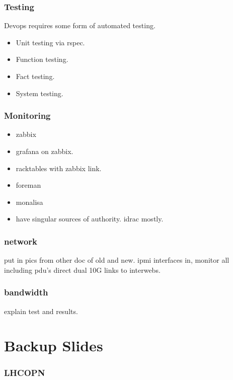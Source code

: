 \documentclass{beamer}
\begin{document}
\begin{frame}
  \frametitle{Testing}
  Devops requires some form of automated testing.
  \begin{itemize}
    \item Unit testing via rspec.
    \item Function testing.
    \item Fact testing.
    \item System testing.
  \end{itemize}
\end{frame}

\begin{frame}
  \frametitle{Monitoring}
  \begin{itemize}
    \item zabbix
    \item grafana on zabbix.
    \item racktables with zabbix link.
    \item foreman
    \item monalisa
    \item have singular sources of authority. idrac mostly.
  \end{itemize}
\end{frame}

\begin{frame}
  \frametitle{network}
  put in pics from other doc of old and new.
  ipmi interfaces in, monitor all including pdu's
  direct dual 10G links to interwebs.
\end{frame}

\begin{frame}
  \frametitle{bandwidth}
  explain test and results.
\end{frame}



\section{Backup Slides}

\begin{frame}
  \frametitle{LHCOPN}
\end{frame}
\end{document}
